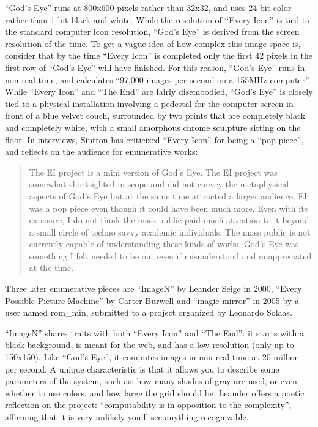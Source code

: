 \documentclass{thesis}
\begin{document}
	``God's Eye'' runs at 800x600 pixels rather than 32x32, and uses 24-bit color rather than 1-bit black and white. While the resolution of ``Every Icon'' is tied to the standard computer icon resolution, ``God's Eye'' is derived from the screen resolution of the time. To get a vague idea of how complex this image space is, consider that by the time ``Every Icon'' is completed only the first 42 pixels in the first row of ``God's Eye'' will have finished. For this reason, ``God's Eye'' runs in non-real-time, and calculates ``97,000 images per second on a 155MHz computer''. While ``Every Icon'' and ``The End'' are fairly disembodied, ``God's Eye'' is closely tied to a physical installation involving a pedestal for the computer screen in front of a blue velvet couch, surrounded by two prints that are completely black and completely white, with a small amorphous chrome sculpture sitting on the floor. In interviews, Sintron has criticized ``Every Icon'' for being a ``pop piece''\cite{olga_goriunova_and_alexei_shulgin_touching_2003}, and reflects on the audience for enumerative works:
	
	\begin{quote}
	The EI project is a mini version of God's Eye. The EI project was somewhat shortsighted in scope and did not convey the metaphysical aspects of God's Eye but at the same time attracted a larger audience. EI was a pop piece even though it could have been much more. Even with its exposure, I do not think the mass public paid much attention to it beyond a small circle of techno savvy academic individuals. The mass public is not currently capable of understanding these kinds of works. God's Eye was something I felt needed to be out even if misunderstood and unappreciated at the time.
	\end{quote}
	
	Three later enumerative pieces are ``ImageN'' by Leander Seige in 2000\cite{leander_seige_imagen_????}, ``Every Possible Picture Machine'' by Carter Burwell\cite{carter_burwell_every_????} and ``magic mirror'' in 2005 by a user named rom\_min\cite{leonardo_solaas_magic_????}, submitted to a project organized by Leonardo Solaas.
	
	``ImageN'' shares traits with both ``Every Icon'' and ``The End'': it starts with a black background, is meant for the web, and has a low resolution (only up to 150x150). Like ``God's Eye'', it computes images in non-real-time at 20 million per second. A unique characteristic is that it allows you to describe some parameters of the system, such as: how many shades of gray are used, or even whether to use colors, and how large the grid should be. Leander offers a poetic reflection on the project: ``computability is in opposition to the complexity'', affirming that it is very unlikely you'll see anything recognizable.
	
\end{document}
